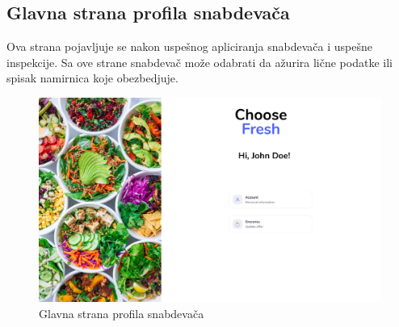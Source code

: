 \subsection{Glavna strana profila snabdevača}

Ova strana pojavljuje se nakon uspešnog apliciranja snabdevača i uspešne inspekcije. Sa ove strane snabdevač može odabrati da ažurira lične podatke ili spisak namirnica koje obezbedjuje.

\begin{figure}[H]
	\begin{center}
		\includegraphics[width=\textwidth]{UI/Supplier Application (Screen 2)-1.png}
    		\caption{Glavna strana profila snabdevača}
    \label{fig:SupplierHomePage}
    \end{center}
\end{figure}